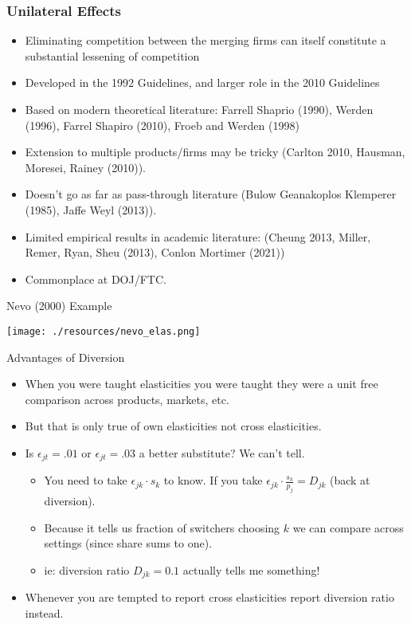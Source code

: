 \documentclass[aspectratio=169,10pt]{beamer}
\begin{document}
\begin{frame}
\frametitle{Unilateral Effects}
\begin{itemize}
\item Eliminating competition between the merging firms can itself constitute a substantial lessening of competition
\item Developed in the 1992 Guidelines, and larger role in the 2010 Guidelines
\item Based on modern theoretical literature: Farrell Shaprio (1990), Werden (1996), Farrel Shapiro (2010), Froeb and Werden (1998)
\item Extension to multiple products/firms may be tricky (Carlton 2010, Hausman, Moresei, Rainey (2010)).
\item Doesn't go as far as pass-through literature (Bulow Geanakoplos Klemperer (1985), Jaffe Weyl (2013)). 
\item Limited empirical results in academic literature: (Cheung 2013, Miller, Remer, Ryan, Sheu (2013), Conlon Mortimer (2021))
\item Commonplace at DOJ/FTC.
\end{itemize} 
\end{frame}

\begin{frame}{Nevo (2000) Example}
\begin{center}
\texttt{[image: ./resources/nevo\_elas.png]}
\end{center}
\end{frame}



\begin{frame}{Advantages of Diversion}
\begin{itemize}
\item When you were taught elasticities you were taught they were a \alert{unit free} comparison across products, markets, etc.
\item But that is only true of \alert{own elasticities} not cross elasticities.
\item Is $\epsilon_{jt}=.01$ or $\epsilon_{jt}=.03$ a better substitute? We can't tell.
\begin{itemize}
\item You need to take $\epsilon_{jk} \cdot s_k$ to know. If you take $\epsilon_{jk} \cdot \frac{s_k}{p_j} = D_{jk}$ (back at diversion).
\item Because it tells us \alert{fraction of switchers} choosing $k$ we can compare across settings (since share sums to one).
\item ie: diversion ratio $D_{jk} = 0.1$ actually tells me something!
\end{itemize}
\item Whenever you are tempted to report \alert{cross elasticities} report \alert{diversion ratio} instead.
\end{itemize}
\end{frame}
\end{document}
